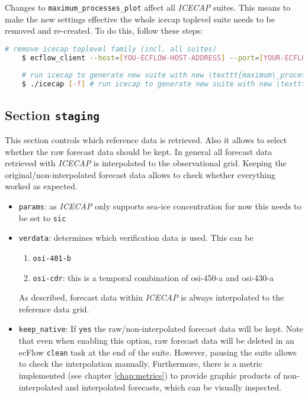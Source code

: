 \documentclass[DIV=10, parskip=full]{scrreprt}
\newcommand{\ice}{\textit{ICECAP}\xspace}
\begin{document}
 Changes to \texttt{maximum\_processes\_plot} affect all \ice suites. This means to make the new settings effective the whole icecap toplevel suite needs to be removed and re-created. To do this, follow these steps:
  \begin{lstlisting}[language=bash]
 	# remove icecap toplevel family (incl. all suites)
 	$ ecflow_client --host=[YOU-ECFLOW-HOST-ADDRESS] --port=[YOUR-ECFLOW-PORT] --delete /icecap
 	
 	# run icecap to generate new suite with new \texttt{maximum\_processes\_plot} value
 	$ ./icecap [-f] # run icecap to generate new suite with new \texttt{maximum\_processes\_plot} value
 \end{lstlisting}
 


\subsection{Section \texttt{staging}} \label{sec:config_staging}
This section controls which reference data is retrieved. Also it allows to select whether the raw forecast data should be kept. In general all forecast data retrieved with \ice is interpolated to the observational grid. Keeping the original/non-interpolated forecast data allows to check whether everything worked as expected. 
 
\begin{itemize}
 \item \texttt{params}: as \ice only supports sea-ice concentration for now this needs to be set to \texttt{sic}
 \item \texttt{verdata}: determines which verification data is used. This can be 
 \begin{enumerate}
 	\item \texttt{osi-401-b}
 	\item \texttt{osi-cdr}: this is a temporal combination of osi-450-a and osi-430-a
 \end{enumerate}
As described, forecast data within \ice is always interpolated to the reference data grid. 
 

  \item \texttt{keep\_native}: If \texttt{yes} the raw/non-interpolated forecast data will be kept. Note that even when enabling this option, raw forecast data will be deleted in an ecFlow \texttt{clean} task at the end of the suite. However, pausing the suite allows to check the interpolation manually. Furthermore, there is a metric implemented (see chapter \ref{chap:metrics}) to provide graphic products of non-interpolated and interpolated forecasts, which can be visually inspected. 
\end{itemize}
\end{document}

